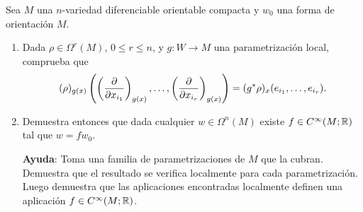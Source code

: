 \documentclass[twoside]{article}
\begin{document}
\begin{ejercicio}{3}
Sea $M$ una $n$-variedad diferenciable orientable compacta y $w_0$ una forma de orientación $M$.
\begin{enumerate}
\item Dada $\rho\in\Omega^r(M)$, $0\leq r\leq n$, y $g:W\to M$ una parametrización local, comprueba que
\[
(\rho)_{g(x)}\left(\left(\frac{\partial }{\partial x_{i_1}}\right)_{g(x)},\dots, \left(\frac{\partial }{\partial x_{i_r}}\right)_{g(x)}\right)=(g^*\rho)_x(e_{i_1},\dots, e_{i_r}).
\]
\item Demuestra entonces que dada cualquier $w\in\Omega^n(M)$ existe $f\in C^{\infty}(M;\mathbb{R})$ tal que $w=fw_0$.

\textbf{Ayuda}: Toma una familia de parametrizaciones de $M$ que la cubran. Demuestra que el resultado se verifica localmente para cada parametrización. Luego demuestra que las aplicaciones encontradas localmente definen una aplicación $f\in C^{\infty}(M;\mathbb{R})$.
\end{enumerate}
\end{ejercicio}
\end{document}
